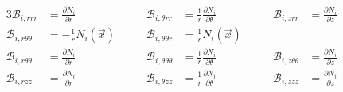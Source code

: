 \documentclass[times,namecite]{goose-article}
\begin{document}
\begin{alignat}{3}
  \mathcal{B}_{i,r      r      r     } &=             \frac{\partial N_i}{\partial r}      & \qquad
  \mathcal{B}_{i,\theta r      r     } &= \frac{1}{r} \frac{\partial N_i}{\partial \theta} & \qquad
  \mathcal{B}_{i,z      r      r     } &=             \frac{\partial N_i}{\partial z}
  \nonumber
  \\
  \mathcal{B}_{i,r      \theta \theta} &= - \frac{1}{r} N_i (\vec{x})  & \qquad
  \mathcal{B}_{i,\theta \theta r     } &=   \frac{1}{r} N_i (\vec{x})  & \qquad
  \nonumber
  \\
  \mathcal{B}_{i,r      \theta \theta} &=             \frac{\partial N_i}{\partial r}       & \qquad
  \mathcal{B}_{i,\theta \theta \theta} &= \frac{1}{r} \frac{\partial N_i}{\partial \theta}  & \qquad
  \mathcal{B}_{i,z      \theta \theta} &=             \frac{\partial N_i}{\partial z}
  \\
  \mathcal{B}_{i,r      z      z     } &=             \frac{\partial N_i}{\partial r}       & \qquad
  \mathcal{B}_{i,\theta z      z     } &= \frac{1}{r} \frac{\partial N_i}{\partial \theta}  & \qquad
  \mathcal{B}_{i,z      z      z     } &=             \frac{\partial N_i}{\partial z}
\end{alignat}
\end{document}
